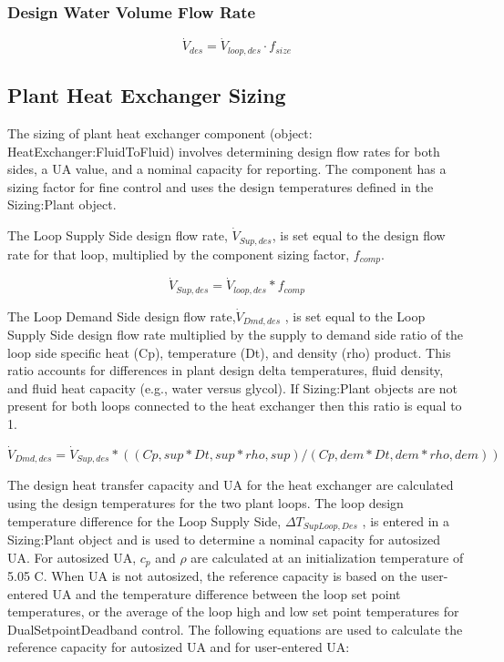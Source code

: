 \subsubsection{Design Water Volume Flow Rate}\label{design-boiler-water-flow-rate-1}

\begin{equation}
\dot V_{des} = \dot V_{loop,des} \cdot f_{size}
\end{equation}

\subsection{Plant Heat Exchanger Sizing}\label{plant-heat-exchanger-sizing}

The sizing of plant heat exchanger component (object: HeatExchanger:FluidToFluid) involves determining design flow rates for both sides, a UA value, and a nominal capacity for reporting. The component has a sizing factor for fine control and uses the design temperatures defined in the Sizing:Plant object.

The Loop Supply Side design flow rate, \({\dot V_{Sup,des}}\), is set equal to the design flow rate for that loop, multiplied by the component sizing factor, \({f_{comp}}\).

\begin{equation}
{\dot V_{Sup,des}} = {\dot V_{loop,des}}*{f_{comp}}
\end{equation}

The Loop Demand Side design flow rate,\({\dot V_{Dmd,des}}\) , is set equal to the Loop Supply Side design flow rate multiplied by the supply to demand side ratio of the loop side specific heat (Cp), temperature (Dt), and density (rho) product. This ratio accounts for differences in plant design delta temperatures, fluid density, and fluid heat capacity (e.g., water versus glycol). If Sizing:Plant objects are not present for both loops connected to the heat exchanger then this ratio is equal to 1.

\begin{equation}
{\dot V_{Dmd,des}} = {\dot V_{Sup,des} * {((Cp,sup * Dt,sup * rho,sup) / (Cp,dem * Dt,dem * rho,dem))}}
\end{equation}

The design heat transfer capacity and UA for the heat exchanger are calculated using the design temperatures for the two plant loops. The loop design temperature difference for the Loop Supply Side, \(\Delta {T_{SupLoop,Des}}\) , is entered in a Sizing:Plant object and is used to determine a nominal capacity for autosized UA. For autosized UA, \(c_p\) and \(\rho\) are calculated at an initialization temperature of 5.05 C. When UA is not autosized, the reference capacity is based on the user-entered UA and the temperature difference between the loop set point temperatures, or the average of the loop high and low set point temperatures for DualSetpointDeadband control. The following equations are used to calculate the reference capacity for autosized UA and for user-entered UA:

